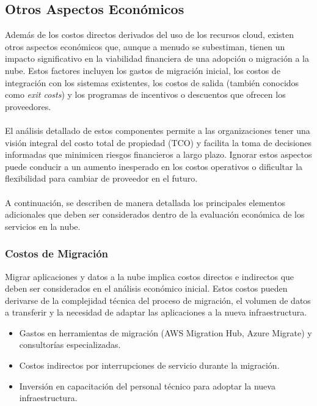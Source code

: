 {        \subsection{Otros Aspectos Económicos}
            Además de los costos directos derivados del uso de los recursos cloud, existen otros aspectos económicos que, aunque a menudo se subestiman, tienen un impacto significativo en la viabilidad financiera de una adopción o migración a la nube. Estos factores incluyen los gastos de migración inicial, los costos de integración con los sistemas existentes, los costos de salida (también conocidos como \textit{exit costs}) y los programas de incentivos o descuentos que ofrecen los proveedores.

            \paragraph{}El análisis detallado de estos componentes permite a las organizaciones tener una visión integral del costo total de propiedad (TCO) y facilita la toma de decisiones informadas que minimicen riesgos financieros a largo plazo. Ignorar estos aspectos puede conducir a un aumento inesperado en los costos operativos o dificultar la flexibilidad para cambiar de proveedor en el futuro.
            
            \paragraph{}A continuación, se describen de manera detallada los principales elementos adicionales que deben ser considerados dentro de la evaluación económica de los servicios en la nube.

            \subsubsection{Costos de Migración}
                Migrar aplicaciones y datos a la nube implica costos directos e indirectos que deben ser considerados en el análisis económico inicial. Estos costos pueden derivarse de la complejidad técnica del proceso de migración, el volumen de datos a transferir y la necesidad de adaptar las aplicaciones a la nueva infraestructura.
                
                \begin{itemize}
                    \item Gastos en herramientas de migración (AWS Migration Hub, Azure Migrate) y consultorías especializadas.
                    \item Costos indirectos por interrupciones de servicio durante la migración.
                    \item Inversión en capacitación del personal técnico para adoptar la nueva infraestructura.
                \end{itemize}

}
